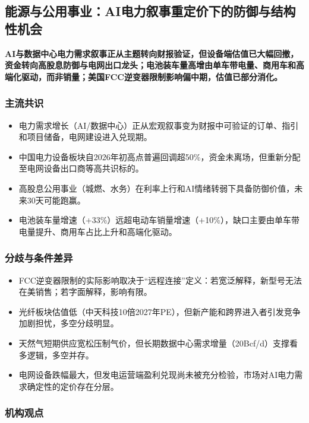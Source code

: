 \documentclass[11pt]{ctexart}
\begin{document}
\subsection{能源与公用事业：AI电力叙事重定价下的防御与结构性机会}
\textbf{AI与数据中心电力需求叙事正从主题转向财报验证，但设备端估值已大幅回撤，资金转向高股息防御与电网出口龙头；电池装车量高增由单车带电量、商用车和高端化驱动，而非销量；美国FCC逆变器限制影响偏中期，估值已部分消化。}
\subsubsection*{主流共识}
\begin{itemize}
  \item 电力需求增长（AI/数据中心）正从宏观叙事变为财报中可验证的订单、指引和项目储备，电网建设进入兑现期。
  \item 中国电力设备板块自2026年初高点普遍回调超50\%，资金未离场，但重新分配至电网设备出口商等高共识标的。
  \item 高股息公用事业（城燃、水务）在利率上行和AI情绪转弱下具备防御价值，未来30天可能跑赢。
  \item 电池装车量增速（+33\%）远超电动车销量增速（+10\%），缺口主要由单车带电量提升、商用车占比上升和高端化驱动。
\end{itemize}
\subsubsection*{分歧与条件差异}
\begin{itemize}
  \item FCC逆变器限制的实际影响取决于“远程连接”定义：若宽泛解释，新型号无法在美销售；若字面解释，影响有限。
  \item 光纤板块估值低（中天科技10倍2027年PE），但新产能和跨界进入者引发竞争加剧担忧，多空分歧明显。
  \item 天然气短期供应宽松压制气价，但长期数据中心需求增量（20Bcf/d）支撑看多逻辑，多空并存。
  \item 电网设备跌幅最大，但发电运营端盈利兑现尚未被充分检验，市场对AI电力需求确定性的定价存在分层。
\end{itemize}
\subsubsection*{机构观点}
\end{document}
